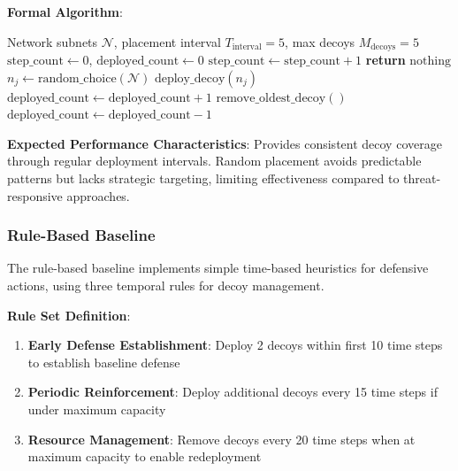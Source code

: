 \documentclass[12pt,oneside]{article}
\begin{document}
\textbf{Formal Algorithm}:
\begin{algorithm}[H]
\caption{Static Decoy Placement Baseline}
\label{alg:static_baseline}
\begin{algorithmic}[1]
\REQUIRE Network subnets $\mathcal{N}$, placement interval $T_{\text{interval}} = 5$, max decoys $M_{\text{decoys}} = 5$
\STATE $\text{step\_count} \leftarrow 0$, $\text{deployed\_count} \leftarrow 0$
    \STATE $\text{step\_count} \leftarrow \text{step\_count} + 1$
        \STATE \textbf{return} $\text{nothing}$ 
    \ENDIF
        \STATE $n_j \leftarrow \text{random\_choice}(\mathcal{N})$ 
        \STATE $\text{deploy\_decoy}(n_j)$
        \STATE $\text{deployed\_count} \leftarrow \text{deployed\_count} + 1$
    \ELSE
        \STATE $\text{remove\_oldest\_decoy}()$ 
        \STATE $\text{deployed\_count} \leftarrow \text{deployed\_count} - 1$
    \ENDIF
\ENDWHILE
\end{algorithmic}
\end{algorithm}

\textbf{Expected Performance Characteristics}: Provides consistent decoy coverage through regular deployment intervals. Random placement avoids predictable patterns but lacks strategic targeting, limiting effectiveness compared to threat-responsive approaches.

\subsubsection{Rule-Based Baseline}

The rule-based baseline implements simple time-based heuristics for defensive actions, using three temporal rules for decoy management.

\textbf{Rule Set Definition}:
\begin{enumerate}
    \item \textbf{Early Defense Establishment}: Deploy 2 decoys within first 10 time steps to establish baseline defense
    \item \textbf{Periodic Reinforcement}: Deploy additional decoys every 15 time steps if under maximum capacity
    \item \textbf{Resource Management}: Remove decoys every 20 time steps when at maximum capacity to enable redeployment
\end{enumerate}
\end{document}
